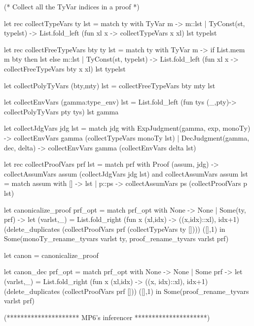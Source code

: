 (* Collect all the TyVar indices in a proof *)

let rec collectTypeVars ty lst =
  match ty with
    TyVar m -> m::lst
  | TyConst(st, typelst) -> List.fold_left (fun xl x -> collectTypeVars x xl) lst typelst

let rec collectFreeTypeVars bty ty lst =
  match ty with
    TyVar m -> if List.mem m bty then lst else m::lst
  | TyConst(st, typelst) ->
    List.fold_left (fun xl x -> collectFreeTypeVars bty x xl) lst typelst

let collectPolyTyVars (bty,mty) lst = collectFreeTypeVars bty mty lst

let collectEnvVars (gamma:type_env) lst =
    List.fold_left (fun tys (_,pty)-> collectPolyTyVars pty tys) lst gamma

let collectJdgVars jdg lst =
    match jdg with ExpJudgment(gamma, exp, monoTy) ->
        collectEnvVars gamma (collectTypeVars monoTy lst)
    | DecJudgment(gamma, dec, delta) ->
        collectEnvVars gamma (collectEnvVars delta lst)

let rec collectProofVars prf lst =
  match prf with Proof (assum, jdg)
   -> collectAssumVars assum (collectJdgVars jdg lst)
and collectAssumVars assum lst =
  match assum with 
    []     -> lst
  | p::ps -> collectAssumVars ps (collectProofVars p lst)

let canonicalize_proof prf_opt =
    match prf_opt with None -> None
    | Some(ty, prf) ->
  let (varlst,_) =
    List.fold_right (fun x (xl,idx) -> ((x,idx)::xl), idx+1) 
      (delete_duplicates (collectProofVars prf (collectTypeVars ty []))) 
      ([],1)
  in Some(monoTy_rename_tyvars varlst ty, proof_rename_tyvars varlst prf)

let canon = canonicalize_proof

let canon_dec prf_opt =
    match prf_opt with None -> None
    | Some prf ->
  let (varlst,_) =
    List.fold_right (fun x (xl,idx) -> ((x, idx)::xl), idx+1) 
      (delete_duplicates (collectProofVars prf []))
      ([],1)
  in Some(proof_rename_tyvars varlst prf)

(********************* MP6's inferencer *********************)

